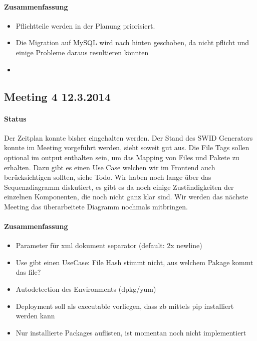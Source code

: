 \paragraph{Zusammenfassung}

\begin{itemize}
\item Pflichtteile werden in der Planung priorisiert.
\item Die Migration auf MySQL wird nach hinten geschoben, da nicht pflicht und einige Probleme daraus resultieren könnten
\item
\end{itemize}
\subsection{Meeting 4 12.3.2014}
\paragraph{Status}
Der Zeitplan konnte bisher eingehalten werden. Der Stand des SWID Generators konnte im Meeting vorgeführt werden, sieht soweit gut aus. 
Die File Tags sollen optional im output enthalten sein, um das Mapping von Files und Pakete zu erhalten. Dazu gibt es einen Use Case welchen wir im Frontend auch berücksichtigen sollten, siehe Todo. Wir haben noch lange über das Sequenzdiagramm diskutiert, es gibt es da noch einige Zuständigkeiten der einzelnen Komponenten, die noch nicht ganz klar sind. Wir werden das nächste Meeting das überarbeitete Diagramm nochmals mitbringen.

\paragraph{Zusammenfassung}
\begin{itemize}
\item Parameter für xml dokument separator (default: 2x newline)
\item Use gibt einen UseCase: File Hash stimmt nicht, aus welchem Pakage kommt das file?
\item Autodetection des Environments (dpkg/yum)
\item Deployment soll als executable vorliegen, dass zb mittels pip installiert werden kann
\item Nur installierte Packages auflisten, ist momentan noch nicht implementiert
\end{itemize}
